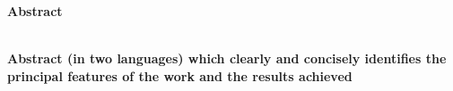 \begin{center}
    \Large{\textbf{Abstract}} \\
\end{center}
~\\[0.5 cm]

\textbf{Abstract (in two languages) which clearly and concisely identifies the principal features of the work and the results achieved}

\newpage
